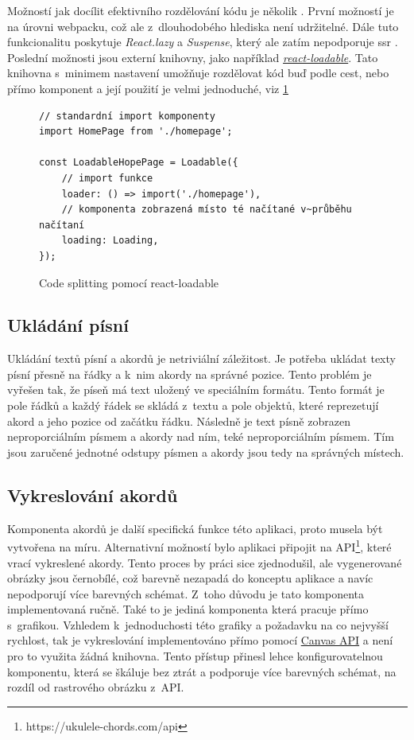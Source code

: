 Možností jak docílit efektivního rozdělování kódu je několik \cite{facebookinc_2018_codesplitting}. První možností je na úrovni webpacku, což ale z~dlouhodobého hlediska není udržitelné. Dále tuto funkcionalitu poskytuje \emph{React.lazy} a \emph{Suspense}, který ale zatím nepodporuje \acrshort{ssr} \cite{facebookinc_2018_codesplitting}. Poslední možnosti jsou externí knihovny, jako například \href{https://github.com/jamiebuilds/react-loadable}{\emph{react-loadable}}. Tato knihovna s~minimem nastavení umožňuje rozdělovat kód buď podle cest, nebo přímo komponent a její použití je velmi jednoduché, viz \ref{code:code_splitting}

\begin{figure}[h!]
    \centering
    \begin{verbatim}
// standardní import komponenty
import HomePage from './homepage';

const LoadableHopePage = Loadable({
    // import funkce
    loader: () => import('./homepage'),
    // komponenta zobrazená místo té načítané v~průběhu načítaní
    loading: Loading,
});
    \end{verbatim}
    \caption{Code splitting pomocí react-loadable}
    \label{code:code_splitting}
\end{figure}

\subsection{Ukládání písní}
\label{ss:song_saving}
Ukládání textů písní a akordů je netriviální záležitost. Je potřeba ukládat texty písní přesně na řádky a k~nim akordy na správné pozice. Tento problém je vyřešen tak, že píseň má text uložený ve speciálním formátu. Tento formát je pole řádků a každý řádek se skládá z~textu a pole objektů, které reprezetují akord a jeho pozice od začátku řádku. Následně je text písně zobrazen neproporciálním písmem a akordy nad ním, teké neproporciálním písmem. Tím jsou zaručené jednotné odstupy písmen a akordy jsou tedy na správných místech.

\subsection{Vykreslování akordů}
\label{ss:chords_render}
Komponenta akordů je další specifická funkce této aplikaci, proto musela být vytvořena na míru. Alternativní možností bylo aplikaci připojit na API\footnote{https://ukulele-chords.com/api}, které vrací vykreslené akordy. Tento proces by práci sice zjednodušil, ale vygenerované obrázky jsou černobílé, což barevně nezapadá do konceptu aplikace a navíc nepodporují více barevných schémat. Z~toho důvodu je tato komponenta implementovaná ručně. Také to je jediná komponenta která pracuje přímo s~grafikou. Vzhledem k~jednoduchosti této grafiky a požadavku na co nejvyšší rychlost, tak je vykreslování implementováno přímo pomocí \href{https://developer.mozilla.org/en-US/docs/Web/API/Canvas_API}{Canvas API} a není pro to využita žádná knihovna. Tento přístup přinesl lehce konfigurovatelnou komponentu, která se škáluje bez ztrát a podporuje více barevných schémat, na rozdíl od rastrového obrázku z~API.

